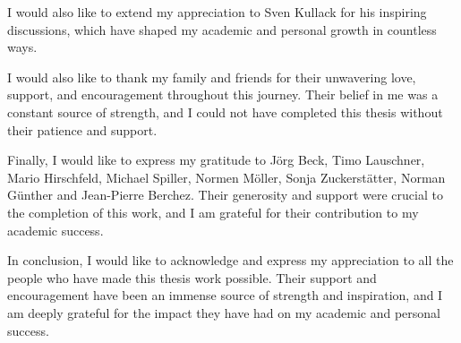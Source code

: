 I would also like to extend my appreciation to Sven Kullack for his inspiring discussions, which have shaped my academic and personal growth in countless ways.

I would also like to thank my family and friends for their unwavering love, support, and encouragement throughout this journey. Their belief in me was a constant source of strength, and I could not have completed this thesis without their patience and support.

Finally, I would like to express my gratitude to Jörg Beck, Timo Lauschner, Mario Hirschfeld, Michael Spiller, Normen Möller, Sonja Zuckerstätter, Norman Günther and Jean-Pierre Berchez. Their generosity and support were crucial to the completion of this work, and I am grateful for their contribution to my academic success.

In conclusion, I would like to acknowledge and express my appreciation to all the people who have made this thesis work possible. Their support and encouragement have been an immense source of strength and inspiration, and I am deeply grateful for the impact they have had on my academic and personal success.
